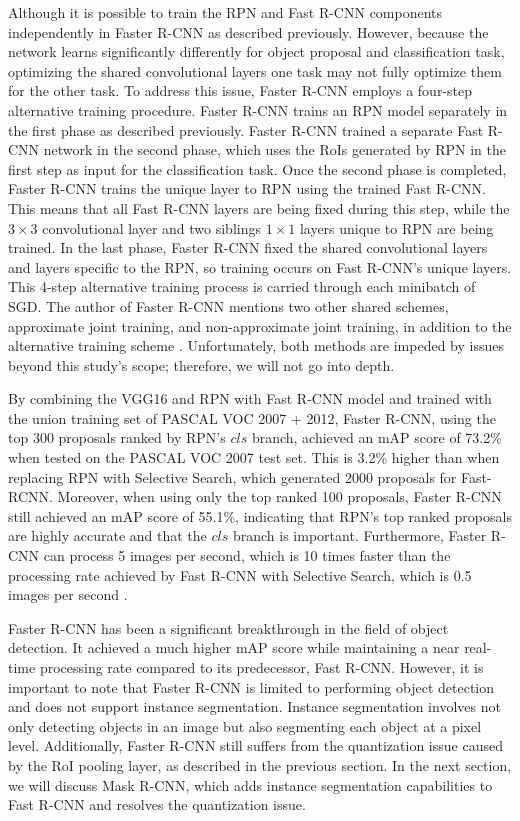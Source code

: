Although it is possible to train the RPN and Fast R-CNN components independently in Faster R-CNN as described previously. However, because the network learns significantly differently for object proposal and classification task, optimizing the shared convolutional layers one task may not fully optimize them for the other task. To address this issue, Faster R-CNN employs a four-step alternative training procedure. Faster R-CNN trains an RPN model separately in the first phase as described previously. Faster R-CNN trained a separate Fast R-CNN network in the second phase, which uses the RoIs generated by RPN in the first step as input for the classification task. Once the second phase is completed, Faster R-CNN trains the unique layer to RPN using the trained Fast R-CNN. This means that all Fast R-CNN layers are being fixed during this step, while the $3 \times 3$ convolutional layer and two siblings $1 \times 1$ layers unique to RPN are being trained. In the last phase, Faster R-CNN fixed the shared convolutional layers and layers specific to the RPN, so training occurs on Fast R-CNN's unique layers. This 4-step alternative training process is carried through each minibatch of SGD. The author of Faster R-CNN mentions two other shared schemes, approximate joint training, and non-approximate joint training, in addition to the alternative training scheme \cite{faster_rcnn_2015}. Unfortunately, both methods are impeded by issues beyond this study's scope; therefore, we will not go into depth.

By combining the VGG16 and RPN with Fast R-CNN model and trained with the union training set of PASCAL VOC 2007 + 2012, Faster R-CNN, using the top 300 proposals ranked by RPN's $cls$ branch, achieved an mAP score of 73.2\% when tested on the PASCAL VOC 2007 test set. This is 3.2\% higher than when replacing RPN with Selective Search, which generated 2000 proposals for Fast-RCNN. Moreover, when using only the top ranked 100 proposals, Faster R-CNN still achieved an mAP score of 55.1\%, indicating that RPN's top ranked proposals are highly accurate and that the $cls$ branch is important. Furthermore, Faster R-CNN can process 5 images per second, which is 10 times faster than the processing rate achieved by Fast R-CNN with Selective Search, which is 0.5 images per second \cite{faster_rcnn_2015}. 

Faster R-CNN has been a significant breakthrough in the field of object detection. It achieved a much higher mAP score while maintaining a near real-time processing rate compared to its predecessor, Fast R-CNN. However, it is important to note that Faster R-CNN is limited to performing object detection and does not support instance segmentation. Instance segmentation involves not only detecting objects in an image but also segmenting each object at a pixel level. Additionally, Faster R-CNN still suffers from the quantization issue caused by the RoI pooling layer, as described in the previous section. In the next section, we will discuss Mask R-CNN, which adds instance segmentation capabilities to Fast R-CNN and resolves the quantization issue.